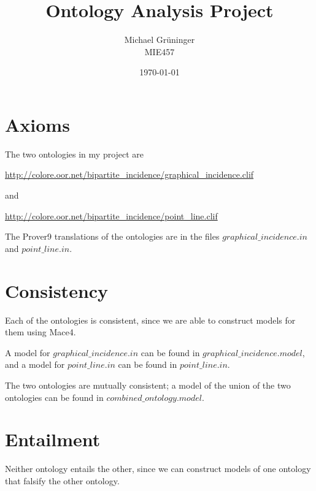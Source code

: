 \documentclass[psamsfonts]{amsart}
\numberwithin{equation}{subsection}
\begin{document}
\newenvironment{example}{\begin{description} \item[Example]}{$\Box$ \end{description}}

\title{Ontology Analysis Project}
\author{Michael Gr\"{u}ninger \\ MIE457}

\date{\today}

\maketitle

\section{Axioms}

The two ontologies in my project are

\url{http://colore.oor.net/bipartite_incidence/graphical_incidence.clif}

and

\url{http://colore.oor.net/bipartite_incidence/point_line.clif}

The Prover9 translations of the ontologies are in the files
$graphical\_incidence.in$ and $point\_line.in$.

\section{Consistency}

Each of the ontologies is consistent, since we are able to construct models for them using Mace4.

A model for $graphical\_incidence.in$ can be found in $graphical\_incidence.model$,
and a model for $point\_line.in$ can be found in $point\_line.in$.


The two ontologies are mutually consistent; a model of the union of the two ontologies can be
found in $combined\_ontology.model$.

\section{Entailment}

Neither ontology entails the other, since we can construct models of one ontology that falsify the 
other ontology.
\end{document}
